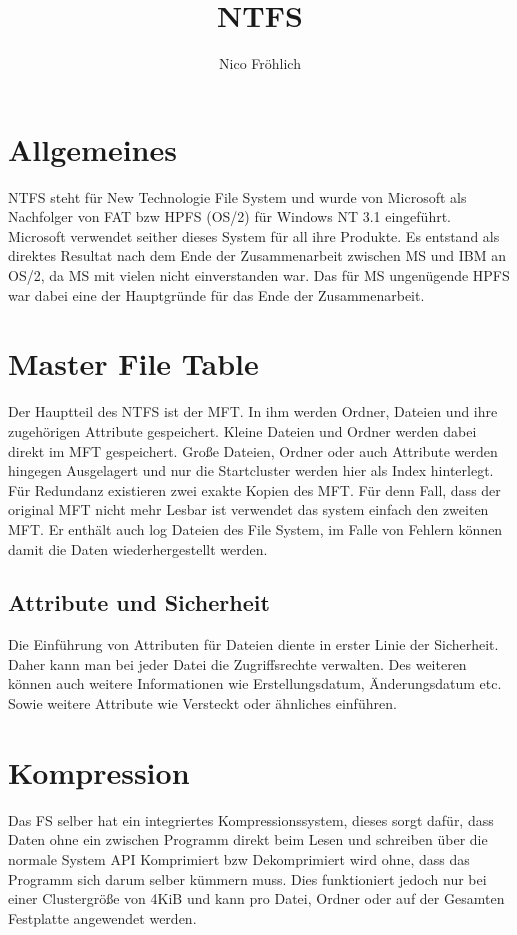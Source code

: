 \documentclass[11pt,a4paper]{article}
\author{Nico Fröhlich}
\title{\vspace{-2.5cm}NTFS}
\begin{document}
\maketitle

\section{Allgemeines}
NTFS steht für New Technologie File System und wurde von Microsoft als Nachfolger von FAT bzw HPFS (OS/2) für Windows NT 3.1 eingeführt. Microsoft verwendet seither dieses System für all ihre Produkte. Es entstand als direktes Resultat nach dem Ende der Zusammenarbeit zwischen MS und IBM an OS/2, da MS mit vielen nicht einverstanden war. Das für MS ungenügende HPFS war dabei eine der Hauptgründe für das Ende der Zusammenarbeit.

\section{Master File Table}
Der Hauptteil des NTFS ist der MFT. In ihm werden Ordner, Dateien und ihre zugehörigen Attribute gespeichert. Kleine Dateien und Ordner werden dabei direkt im MFT gespeichert. Große Dateien, Ordner oder auch Attribute werden hingegen Ausgelagert und nur die Startcluster werden hier als Index hinterlegt. Für Redundanz existieren zwei exakte Kopien des MFT. Für denn Fall, dass der original MFT nicht mehr Lesbar ist verwendet das system einfach den zweiten MFT. Er enthält auch log Dateien des File System, im Falle von Fehlern können damit die Daten wiederhergestellt werden.

\subsection{Attribute und Sicherheit}
Die Einführung von Attributen für Dateien diente in erster Linie der Sicherheit. Daher kann man bei jeder Datei die Zugriffsrechte verwalten. Des weiteren können auch weitere Informationen wie Erstellungsdatum, Änderungsdatum etc. Sowie weitere Attribute wie Versteckt oder ähnliches einführen.

\section{Kompression}
Das FS selber hat ein integriertes Kompressionssystem, dieses sorgt dafür, dass Daten ohne ein zwischen Programm direkt beim Lesen und schreiben über die normale System API Komprimiert bzw Dekomprimiert wird ohne, dass das Programm sich darum selber kümmern muss. Dies funktioniert jedoch nur bei einer Clustergröße von 4KiB und kann pro Datei, Ordner oder auf der Gesamten Festplatte angewendet werden.
\end{document}
